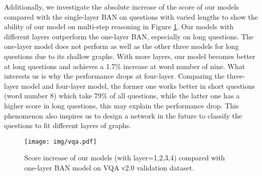 \documentclass[10pt,twocolumn,letterpaper]{article}
\begin{document}
\begin{table}
	\centering
\vspace{3pt}
\caption{Score on VQA v2.0 validation dataset.  denotes stacking  layers of the proposed model. V-graph is short for image-graph, Q-graph for question-graph, BGNs for (V-graph + Q-graph), and SDP for scaled dot-product.}
\label{table:vqa_model2}
\vspace{-5pt}
\end{table}

Additionally, we investigate the absolute increase of the score of our models compared with the single-layer BAN on questions with varied lengths to show the ability of our model on multi-step reasoning in Figure \ref{fig:vqa}. Our models with different layers outperform the one-layer BAN, especially on long questions. The one-layer model does not perform as well as the other three models for long questions due to its shallow graphs. With more layers, our model becomes better at long questions and achieves a 1.7\% increase at word number of nine. What interests us is why the performance drops at four-layer. Comparing the three-layer model and four-layer model, the former one works better in short questions (word number  8) which take 79\% of all questions, while the latter one has a higher score in long questions, this may explain the performance drop. This phenomenon also inspires us to design a network in the future to classify the questions to fit different layers of graphs.
\begin{figure}
	\centering
	\texttt{[image: img/vqa.pdf]}
	\caption{Score increase of our models (with layer=1,2,3,4) compared with one-layer BAN model on VQA v2.0 validation dataset.}
	\label{fig:vqa}
	\vspace{-5pt}
\end{figure}
\end{document}
